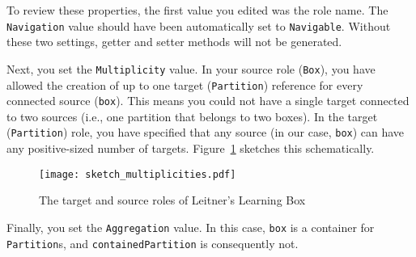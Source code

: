 To review these properties, the first value you edited was the role name. The \texttt{Navigation} value should have been automatically set to
\texttt{Na\-vi\-ga\-ble}. Without these two settings, getter and setter methods will not be generated.

Next, you set the \texttt{Multiplicity} value.  In your source role (\texttt{Box}), you have allowed the creation of up to one target (\texttt{Partition})
reference for every connected source (\texttt{box}). This means you could not have a single target connected to two sources (i.e., one partition that belongs to
two boxes). In the target (\texttt{Partition}) role, you have specified that any source (in our case, \texttt{box}) can have any positive-sized number of targets.
Figure~\ref{fig:sketch_roles} sketches this schematically.

\vspace{0.5cm}

\begin{figure}[htbp]
	\centering
    \texttt{[image: sketch\_multiplicities.pdf]}
	\caption{The target and source roles of Leitner's Learning Box}
	\label{fig:sketch_roles}
\end{figure}
\FloatBarrier

Finally, you set the \texttt{Aggregation} value. In this case, \texttt{box} is a container for \texttt{Partition}s, and \texttt{containedPartition} is
consequently not.

